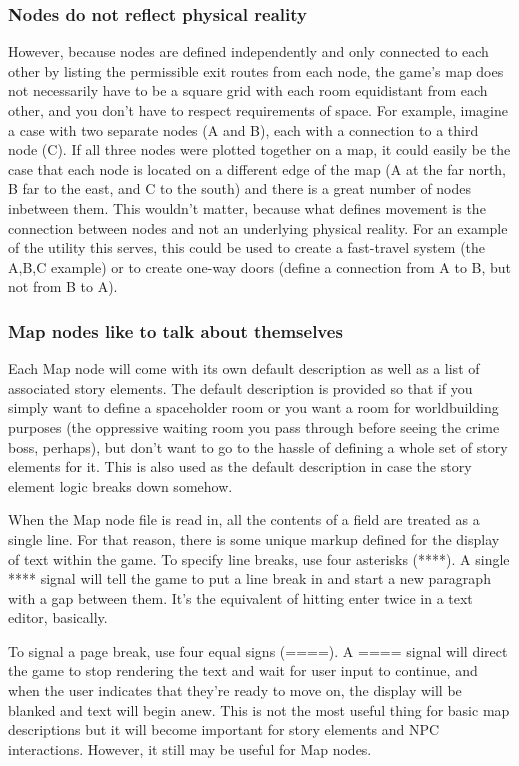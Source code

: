 \documentclass[11pt]{article}
\begin{document}
\subsubsection{Nodes do not reflect physical reality}
However, because nodes are defined independently and only connected to each other by listing the permissible exit routes from each node, the game's map does not necessarily have to be a square grid with each room equidistant from each other, and you don't have to respect requirements of space.
For example, imagine a case with two separate nodes (A and B), each with a connection to a third node (C).
If all three nodes were plotted together on a map, it could easily be the case that each node is located on a different edge of the map (A at the far north, B far to the east, and C to the south) and there is a great number of nodes inbetween them.
This wouldn't matter, because what defines movement is the connection between nodes and not an underlying physical reality.
For an example of the utility this serves, this could be used to create a fast-travel system (the A,B,C example) or to create one-way doors (define a connection from A to B, but not from B to A).

\subsubsection{Map nodes like to talk about themselves}
Each Map node will come with its own default description as well as a list of associated story elements.
The default description is provided so that if you simply want to define a spaceholder room or you want a room for worldbuilding purposes (the oppressive waiting room you pass through before seeing the crime boss, perhaps), but don't want to go to the hassle of defining a whole set of story elements for it.
This is also used as the default description in case the story element logic breaks down somehow.

When the Map node file is read in, all the contents of a field are treated as a single line.
For that reason, there is some unique markup defined for the display of text within the game.
To specify line breaks, use four asterisks (****).
A single **** signal will tell the game to put a line break in and start a new paragraph with a gap between them.
It's the equivalent of hitting enter twice in a text editor, basically.

To signal a page break, use four equal signs (====).
A ==== signal will direct the game to stop rendering the text and wait for user input to continue, and when the user indicates that they're ready to move on, the display will be blanked and text will begin anew.
This is not the most useful thing for basic map descriptions but it will become important for story elements and NPC interactions.
However, it still may be useful for Map nodes.
\end{document}
